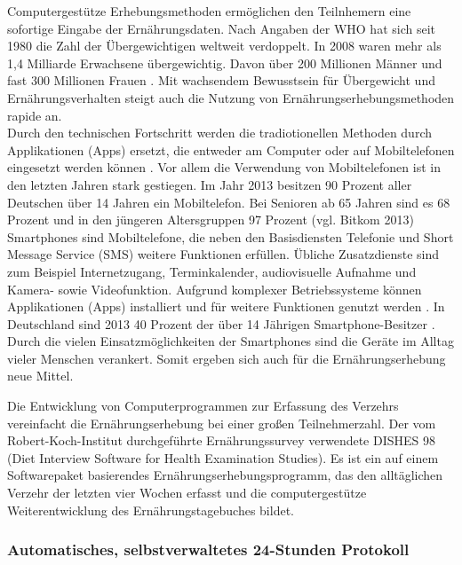 Computergestütze Erhebungsmethoden ermöglichen den Teilnhemern eine sofortige Eingabe der Ernährungsdaten. Nach Angaben der WHO hat sich seit 1980 die Zahl der Übergewichtigen weltweit verdoppelt. In 2008 waren mehr als 1,4 Milliarde Erwachsene übergewichtig. Davon über 200 Millionen Männer und fast 300 Millionen Frauen \cite{whoobesityfactsheet}. Mit wachsendem Bewusstsein für Übergewicht und Ernährungsverhalten steigt auch die Nutzung von Ernährungserhebungsmethoden rapide an.\\ Durch den technischen Fortschritt werden die tradiotionellen Methoden durch Applikationen (Apps) ersetzt, die entweder am Computer oder auf Mobiltelefonen eingesetzt werden können \cite{Morikawa:2012:FRS:2390776.2390779}. Vor allem die Verwendung von Mobiltelefonen ist in den letzten Jahren stark gestiegen. Im Jahr 2013 besitzen 90 Prozent aller Deutschen über 14 Jahren ein Mobiltelefon. Bei Senioren ab 65 Jahren sind es 68 Prozent und in den jüngeren Altersgruppen 97 Prozent (vgl. Bitkom 2013) \cite{63MillionenHandy} Smartphones sind Mobiltelefone, die neben den Basisdiensten Telefonie und Short Message Service (SMS) weitere Funktionen erfüllen. Übliche Zusatzdienste sind zum Beispiel Internetzugang, Terminkalender, audiovisuelle Aufnahme und Kamera- sowie Videofunktion. Aufgrund komplexer Betriebssysteme können Applikationen (Apps) installiert und für weitere Funktionen genutzt werden \cite{Wirtschaftslexikon}. In Deutschland sind 2013 40 Prozent der über 14 Jährigen Smartphone-Besitzer \cite{63MillionenHandy}. Durch die vielen Einsatzmöglichkeiten der Smartphones sind die Geräte im Alltag vieler Menschen verankert. Somit ergeben sich auch für die Ernährungserhebung neue Mittel. 

Die Entwicklung von Computerprogrammen zur Erfassung des Verzehrs vereinfacht die Ernährungserhebung bei einer großen Teilnehmerzahl. Der vom Robert-Koch-Institut durchgeführte Ernährungssurvey verwendete DISHES 98 (Diet Interview Software for Health Examination Studies). Es ist ein auf einem Softwarepaket basierendes Ernährungserhebungsprogramm, das den alltäglichen Verzehr der letzten vier Wochen erfasst und die computergestütze Weiterentwicklung des Ernährungstagebuches bildet.   \cite{validityofDISHES98}

\subsubsection{Automatisches, selbstverwaltetes 24-Stunden Protokoll}

